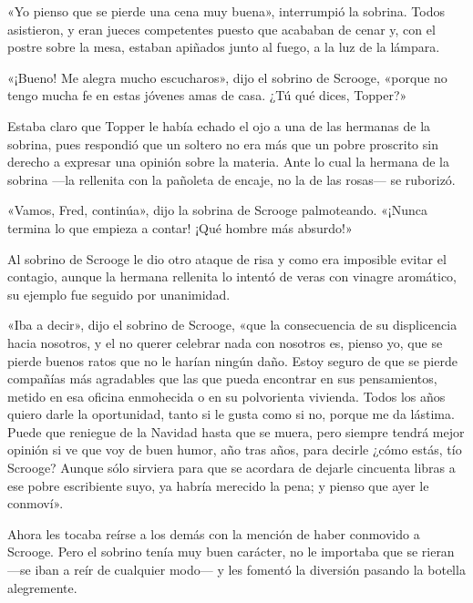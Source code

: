 \documentclass{novela}
\begin{document}
 «Yo pienso que se pierde una cena muy buena», interrumpió la sobrina. Todos asistieron, y eran jueces competentes puesto que acababan de cenar y, con el postre sobre la mesa, estaban apiñados junto al fuego, a la luz de la lámpara.

 «¡Bueno! Me alegra mucho escucharos», dijo el sobrino de Scrooge, «porque no tengo mucha fe en estas jóvenes amas de casa. ¿Tú qué dices, Topper?»

 Estaba claro que Topper le había echado el ojo a una de las hermanas de la sobrina, pues respondió que un soltero no era más que un pobre proscrito sin derecho a expresar una opinión sobre la materia. Ante lo cual la hermana de la sobrina ---la rellenita con la pañoleta de encaje, no la de las rosas--- se ruborizó.

 «Vamos, Fred, continúa», dijo la sobrina de Scrooge palmoteando. «¡Nunca termina lo que empieza a contar! ¡Qué hombre más absurdo!»

 Al sobrino de Scrooge le dio otro ataque de risa y como era imposible evitar el contagio, aunque la hermana rellenita lo intentó de veras con vinagre aromático, su ejemplo fue seguido por unanimidad.

 «Iba a decir», dijo el sobrino de Scrooge, «que la consecuencia de su displicencia hacia nosotros, y el no querer celebrar nada con nosotros es, pienso yo, que se pierde buenos ratos que no le harían ningún daño. Estoy seguro de que se pierde compañías más agradables que las que pueda encontrar en sus pensamientos, metido en esa oficina enmohecida o en su polvorienta vivienda. Todos los años quiero darle la oportunidad, tanto si le gusta como si no, porque me da lástima. Puede que reniegue de la Navidad hasta que se muera, pero siempre tendrá mejor opinión si ve que voy de buen humor, año tras años, para decirle ¿cómo estás, tío Scrooge? Aunque sólo sirviera para que se acordara de dejarle cincuenta libras a ese pobre escribiente suyo, ya habría merecido la pena; y pienso que ayer le conmoví».

 Ahora les tocaba reírse a los demás con la mención de haber conmovido a Scrooge. Pero el sobrino tenía muy buen carácter, no le importaba que se rieran ---se iban a reír de cualquier modo--- y les fomentó la diversión pasando la botella alegremente.
\end{document}
